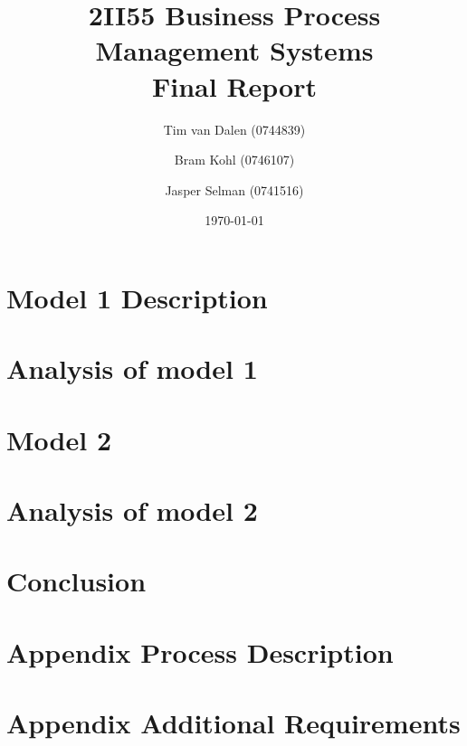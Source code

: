 \documentclass[11pt,a4paper]{article}
\title{
	{\huge 2II55 Business Process Management Systems}\\
	{\large Final Report}
}
\author{
	Tim van Dalen (0744839)
	\and
	Bram Kohl (0746107)
	\and
	Jasper Selman (0741516)
}
\date{\today}
\begin{document}
	\maketitle

	

	\section{Model 1 Description}
	\label{sec:model1}
	

	\section{Analysis of model 1}
	\label{sec:analysis1}
	

	\section{Model 2}
	\label{sec:model2}
	

	\section{Analysis of model 2}
	\label{sec:analysis2}
	

	\section{Conclusion}
	\label{sec:conclusion}
	

	\newpage
	\begin{appendix}

	\section{Appendix Process Description}
	\label{app:appendix_exercise}
	
	
	

	\section{Appendix Additional Requirements}
	\label{app:appendix_additional}
	

	
	\end{appendix}
\end{document}
